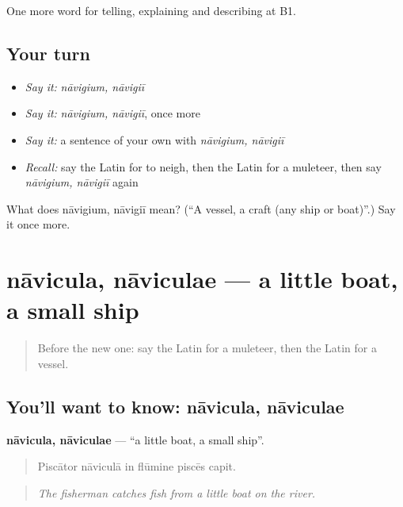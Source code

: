\begin{grammarlens}[title={What you've built}]
One more word for telling, explaining and describing at B1.
\end{grammarlens}

\subsection*{Your turn}
\begin{itemize}
\raggedright
  \item \emph{Say it:} \emph{nāvigium, nāvigiī}
  \item \emph{Say it:} \emph{nāvigium, nāvigiī}, once more
  \item \emph{Say it:} a sentence of your own with \emph{nāvigium, nāvigiī}
  \item \emph{Recall:} say the Latin for to neigh, then the Latin for a muleteer, then say \emph{nāvigium, nāvigiī} again
\end{itemize}

\begin{tcolorbox}[breakable,colback=teal!4,colframe=teal!35!black,title={Before you move on}]
What does nāvigium, nāvigiī mean? (\textquotedblleft{}A vessel, a craft (any ship or boat)\textquotedblright{}.) Say it once more.
\end{tcolorbox}
\section[nāvicula, nāviculae]{nāvicula, nāviculae — a little boat, a small ship}

\label{lesson:LA-C435-navicula}



\begin{quote}
Before the new one: say the Latin for a muleteer, then the Latin for a vessel.
\end{quote}

\subsection*{You'll want to know: nāvicula, nāviculae}
\textbf{nāvicula, nāviculae} — \textquotedblleft{}a little boat, a small ship\textquotedblright{}.

\begin{quote}
Piscātor nāviculā in flūmine piscēs capit.
\end{quote}

\begin{quote}
\emph{The fisherman catches fish from a little boat on the river.}
\end{quote}

